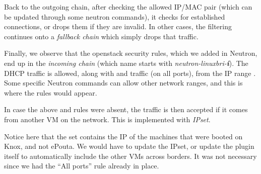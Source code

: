 Back to the outgoing chain, after checking the allowed IP/MAC pair
(which can be updated through some neutron commands), it checks for
established connections, or drops them if they are invalid. In other
cases, the filtering continues onto a \emph{fallback chain} which
simply drops that traffic.


Finally, we observe that the openstack security rules, which we added
in Neutron, end up in the \emph{incoming chain} (which name starts
with \emph{neutron-linuxbri-\textbf{i}}). The DHCP traffic is allowed,
along with  and  traffic (on all ports), from the IP
range . Some specific Neutron commands can allow
other network ranges, and this is where the rules would appear.


In case the above  and  rules were absent, the
traffic is then accepted if it comes from another VM on the
network. This is implemented with \emph{IPset}.


Notice here that the set contains the IP of the machines that were
booted on Knox, and not ePouta. We would have to update the IPset, or
update the plugin itself to automatically include the other VMs across
borders. It was not necessary since we had the ``All  ports''
rule already in place.
